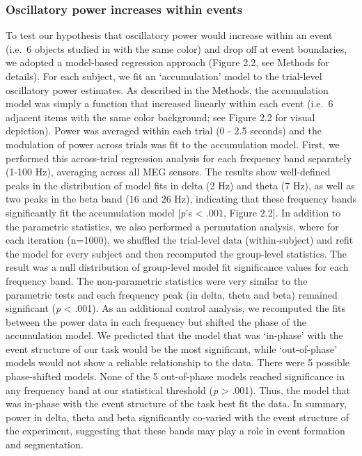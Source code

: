 \subsubsection{Oscillatory power increases within
events}\label{oscillatory-power-increases-within-events}

To test our hypothesis that oscillatory power would increase within an
event (i.e.~6 objects studied in with the same color) and drop off at
event boundaries, we adopted a model-based regression approach (Figure
2.2, see Methods for details). For each subject, we fit an
`accumulation' model to the trial-level oscillatory power estimates. As
described in the Methods, the accumulation model was simply a function
that increased linearly within each event (i.e.~6 adjacent items with
the same color background; see Figure 2.2 for visual depiction). Power
was averaged within each trial (0 - 2.5 seconds) and the modulation of
power across trials was fit to the accumulation model. First, we
performed this across-trial regression analysis for each frequency band
separately (1-100 Hz), averaging across all MEG sensors. The results
show well-defined peaks in the distribution of model fits in delta (2
Hz) and theta (7 Hz), as well as two peaks in the beta band (16 and 26
Hz), indicating that these frequency bands significantly fit the
accumulation model {[}\emph{p}'s \textless{} .001, Figure 2.2{]}. In
addition to the parametric statistics, we also performed a permutation
analysis, where for each iteration (n=1000), we shuffled the trial-level
data (within-subject) and refit the model for every subject and then
recomputed the group-level statistics. The result was a null
distribution of group-level model fit significance values for each
frequency band. The non-parametric statistics were very similar to the
parametric tests and each frequency peak (in delta, theta and beta)
remained significant (\emph{p} \textless{} .001). As an additional
control analysis, we recomputed the fits between the power data in each
frequency but shifted the phase of the accumulation model. We predicted
that the model that was `in-phase' with the event structure of our task
would be the most significant, while `out-of-phase' models would not
show a reliable relationship to the data. There were 5 possible
phase-shifted models. None of the 5 out-of-phase models reached
significance in any frequency band at our statistical threshold
(\emph{p} \textgreater{} .001). Thus, the model that was in-phase with
the event structure of the task best fit the data. In summary, power in
delta, theta and beta significantly co-varied with the event structure
of the experiment, suggesting that these bands may play a role in event
formation and segmentation.

